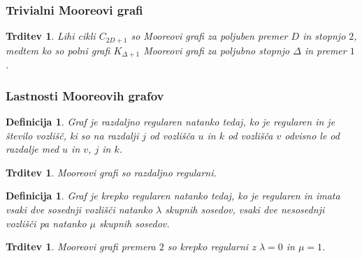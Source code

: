 \documentclass{beamer}
\newtheorem{trditev}[izrek]{Trditev}
\newtheorem{definicija}[izrek]{Definicija}
\begin{document}
\begin{frame}
    \frametitle{Trivialni Mooreovi grafi}
    \begin{trditev}
        Lihi cikli $C_{2D+1}$ so Mooreovi grafi za poljuben premer $D$ in stopnjo $2$,
        medtem ko so polni grafi $K_{\Delta+1}$ Mooreovi grafi za poljubno stopnjo $\Delta$ in premer $1$.
    \end{trditev}
    \begin{center}
    \end{center}
\end{frame}

\begin{frame}
    \frametitle{Lastnosti Mooreovih grafov}
    \begin{definicija}
        Graf je \emph{razdaljno regularen} natanko tedaj, ko je regularen in je število vozlišč, ki so 
        na razdalji $j$ od vozlišča $u$ in $k$ od vozlišča $v$ odvisno le od razdalje 
        med $u$ in $v$, $j$ in $k$.
    \end{definicija}
    \begin{trditev}
        Mooreovi grafi so razdaljno regularni.
    \end{trditev}

    \begin{definicija}
        Graf je krepko regularen natanko tedaj, ko je regularen in imata vsaki dve sosednji vozlišči
        natanko $\lambda$ skupnih sosedov, vsaki dve nesosednji vozlišči pa natanko $\mu$ skupnih sosedov.
    \end{definicija}
    \begin{trditev}
        Mooreovi grafi premera $2$ so krepko regularni z $\lambda = 0$ in $\mu = 1$.
    \end{trditev}
\end{frame}
\end{document}
